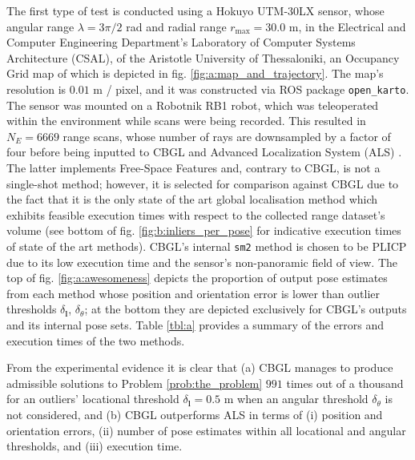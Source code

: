 The first type of test is conducted using a Hokuyo UTM-30LX sensor, whose
angular range $\lambda = 3\pi/2$ rad and radial range $r_{\max} = 30.0$ m,
in the  Electrical and Computer Engineering Department's Laboratory of Computer
Systems Architecture (CSAL), of the Aristotle University of Thessaloniki, an
Occupancy Grid map of which is depicted in fig.
\ref{fig:a:map_and_trajectory}. The map's resolution is $0.01$ m / pixel, and
it was constructed via ROS package \texttt{open\_karto}. The sensor was mounted
on a Robotnik RB1 robot, which was teleoperated within the environment while
scans were being recorded.  This resulted in $N_E = 6669$ range scans, whose
number of rays are downsampled by a factor of four before being inputted to
CBGL and Advanced Localization System (ALS) \cite{als_jp}. The latter
implements Free-Space Features \cite{als_eth} and, contrary to CBGL, is not a
single-shot method; however, it is selected for comparison against CBGL due to
the fact that it is the only state of the art global localisation method which
exhibits feasible execution times with respect to the collected range dataset's
volume (see bottom of fig.  \ref{fig:b:inliers_per_pose} for indicative
execution times of state of the art methods). CBGL's internal \texttt{sm2}
method is chosen to be PLICP \cite{Censi2008c} due to its low execution time
and the sensor's non-panoramic field of view. The top of fig.
\ref{fig:a:awesomeness} depicts the proportion of output pose estimates from
each method whose position and orientation error is lower than outlier
thresholds $\delta_{\bm{l}}$, $\delta_{\theta}$; at the bottom they are
depicted exclusively for CBGL's outputs and its internal pose sets. Table
\ref{tbl:a} provides a summary of the errors and execution times of the two
methods.

From the experimental evidence it is clear that (a) CBGL manages to produce
admissible solutions to Problem \ref{prob:the_problem} $991$ times out of a
thousand for an outliers' locational threshold $\delta_{\bm{l}} = 0.5$ m when
an angular threshold $\delta_{\theta}$ is not considered, and (b) CBGL
outperforms ALS in terms of (i) position and orientation errors, (ii) number of
pose estimates within all locational and angular thresholds, and (iii) execution
time.

